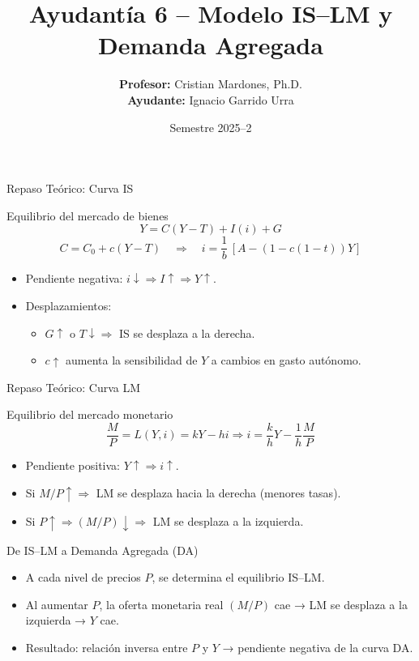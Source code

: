\documentclass[aspectratio=169]{beamer}
\title[\textbf{Ayudantía 6 – IS–LM y DA}]{\textbf{Ayudantía 6 – Modelo IS–LM y Demanda Agregada}}
\author{\textbf{Profesor:} Cristian Mardones, Ph.D.\\[2pt]\textbf{Ayudante:} Ignacio Garrido Urra}
\institute{Facultad de Ingeniería\\Departamento de Ingeniería Industrial – Universidad de Concepción}
\date{Semestre 2025–2}
\begin{document}
\begin{frame}
  \titlepage
\end{frame}



\begin{frame}{Repaso Teórico: Curva IS}
\begin{block}{Equilibrio del mercado de bienes}
\[
Y = C(Y - T) + I(i) + G
\]
\[
C = C_0 + c(Y - T) \quad \Rightarrow \quad i = \frac{1}{b}\,[A - (1 - c(1-t))Y]
\]
\end{block}
\begin{itemize}
  \item Pendiente negativa: \(i \downarrow \Rightarrow I \uparrow \Rightarrow Y \uparrow\).
  \item Desplazamientos:
    \begin{itemize}
      \item \(G \uparrow\) o \(T \downarrow \Rightarrow\) IS se desplaza a la derecha.
      \item \(c \uparrow\) aumenta la sensibilidad de \(Y\) a cambios en gasto autónomo.
    \end{itemize}
\end{itemize}
\end{frame}

\begin{frame}{Repaso Teórico: Curva LM}
\begin{block}{Equilibrio del mercado monetario}
\[
\frac{M}{P} = L(Y,i) = kY - hi
\Rightarrow i = \frac{k}{h}Y - \frac{1}{h}\frac{M}{P}
\]
\end{block}
\begin{itemize}
  \item Pendiente positiva: \(Y \uparrow \Rightarrow i \uparrow\).
  \item Si \(M/P \uparrow \Rightarrow\) LM se desplaza hacia la derecha (menores tasas).
  \item Si \(P \uparrow \Rightarrow (M/P) \downarrow \Rightarrow\) LM se desplaza a la izquierda.
\end{itemize}
\end{frame}

\begin{frame}{De IS–LM a Demanda Agregada (DA)}
\begin{itemize}
  \item A cada nivel de precios \(P\), se determina el equilibrio IS–LM.
  \item Al aumentar \(P\), la oferta monetaria real \((M/P)\) cae → LM se desplaza a la izquierda → \(Y\) cae.
  \item Resultado: relación inversa entre \(P\) y \(Y\) → pendiente negativa de la curva DA.
\end{itemize}
\end{frame}
\end{document}
